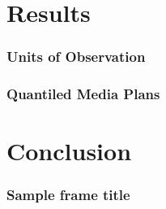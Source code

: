 \documentclass{beamer}
\begin{document}
\section{Results}

\begin{frame}
\frametitle{Units of Observation}
\end{frame}

\begin{frame}
\frametitle{Quantiled Media Plans}
\end{frame}


\section{Conclusion}

\begin{frame}
\frametitle{Sample frame title}
\end{frame}
\end{document}
